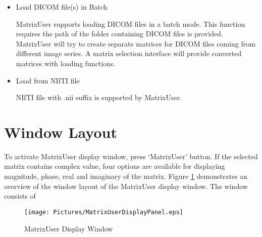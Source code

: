 \documentclass{article}%
\begin{document}
\begin{itemize}
\item Load DICOM file(s) in Batch

MatrixUser supports loading DICOM files in a batch mode. This function requires the path of the folder containing DICOM files is provided. MatrixUser will try to create separate matrices for DICOM files coming from different image series. A matrix selection interface will provide converted matrices with loading functions.

\item Load from NIfTI file

NIfTI file with .nii suffix is supported by MatrixUser.
		
\end{itemize}


\section{Window Layout}

To activate MatrixUser display window, press `MatrixUser' button. If the selected matrix contains complex value, four options are available for displaying magnitude, phase, real and imaginary of the matrix. Figure \ref{fig:MatrixUserDisplayPanel} demonstrates an overview of the window layout of the MatrixUser display window. The window consists of 


\begin{figure}[htbp]
	\centering
		\texttt{[image: Pictures/MatrixUserDisplayPanel.eps]}
	\caption{MatrixUser Display Window}
	\label{fig:MatrixUserDisplayPanel}
\end{figure}
\end{document}

